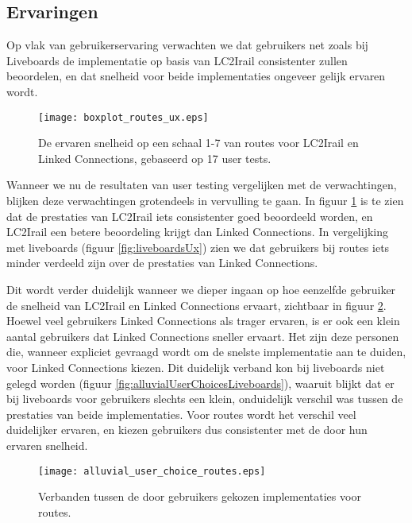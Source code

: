 \subsection{Ervaringen}

Op vlak van gebruikerservaring verwachten we dat gebruikers net zoals bij Liveboards de implementatie op basis van LC2Irail consistenter zullen beoordelen, en dat snelheid voor beide implementaties ongeveer gelijk ervaren wordt.

\begin{figure}[h]
	\centering
	\texttt{[image: boxplot\_routes\_ux.eps]}
	\caption[Ervaren snelheid van routes]{De ervaren snelheid op een schaal 1-7 van routes voor LC2Irail en Linked Connections, gebaseerd op 17 user tests.}
	\label{fig:routesUx}
\end{figure}

Wanneer we nu de resultaten van user testing vergelijken met de verwachtingen, blijken deze verwachtingen grotendeels in vervulling te gaan. In figuur \ref{fig:routesUx} is te zien dat de prestaties van LC2Irail iets consistenter goed beoordeeld worden, en LC2Irail een betere beoordeling krijgt dan Linked Connections. In vergelijking met liveboards (figuur \ref{fig:liveboardsUx}) zien we dat gebruikers bij routes iets minder verdeeld zijn over de prestaties van Linked Connections.

Dit wordt verder duidelijk wanneer we dieper ingaan op hoe eenzelfde gebruiker de snelheid van LC2Irail en Linked Connections ervaart, zichtbaar in figuur \ref{fig:alluvialUserChoicesRoutes}. Hoewel veel gebruikers Linked Connections als trager ervaren, is er ook een klein aantal gebruikers dat Linked Connections sneller ervaart. Het zijn deze personen die, wanneer expliciet gevraagd wordt om de snelste implementatie aan te duiden, voor Linked Connections kiezen. Dit duidelijk verband kon bij liveboards niet gelegd worden (figuur \ref{fig:alluvialUserChoicesLiveboards}), waaruit blijkt dat er bij liveboards voor gebruikers slechts een klein, onduidelijk verschil was tussen de prestaties van beide implementaties. Voor routes wordt het verschil veel duidelijker ervaren, en kiezen gebruikers dus consistenter met de door hun ervaren snelheid.

\begin{figure}[ht]
	\centering
	\texttt{[image: alluvial\_user\_choice\_routes.eps]}
	\caption[Door gebruikers gekozen implementatie voor routes]{Verbanden tussen de door gebruikers gekozen implementaties voor routes. }
	\label{fig:alluvialUserChoicesRoutes}
\end{figure}

